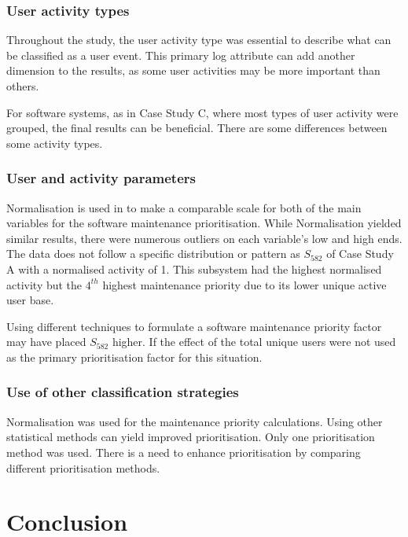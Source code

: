 \subsubsection{User activity types}
Throughout the study, the user activity type was essential to describe what can be classified as a user event. This primary log attribute can add another dimension to the results, as some user activities may be more important than others. \par For software systems, as in Case Study C, where most types of user activity were grouped, the final results can be beneficial. There are some differences between some activity types. 

\subsubsection{User and activity parameters}
\par Normalisation is used in  to make a comparable scale for both of the main variables for the software maintenance prioritisation. While Normalisation yielded similar results, there were numerous outliers on each variable's low and high ends. The data does not follow a specific distribution or pattern as $S_{582}$ of Case Study A with a normalised activity of 1. This subsystem had the highest normalised activity but the $4^{th}$ highest maintenance priority due to its lower unique active user base.\par Using different techniques to formulate a software maintenance priority factor may have placed $S_{582}$ higher. If the effect of the total unique users were not used as the primary prioritisation factor for this situation. 

\subsubsection{Use of other classification strategies}
Normalisation was used for the maintenance priority calculations. Using other statistical methods can yield improved prioritisation. Only one prioritisation method was used. There is a need to enhance prioritisation by comparing different prioritisation methods.

\clearpage

\section{Conclusion}

